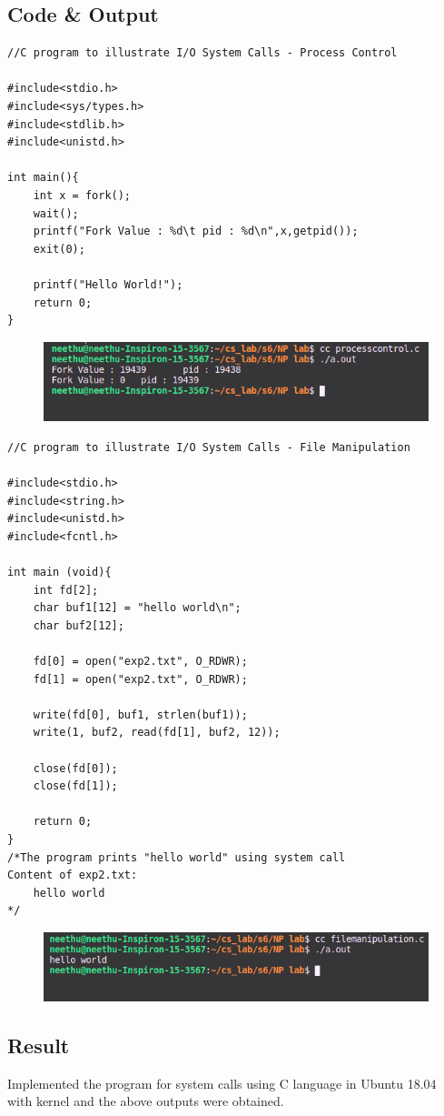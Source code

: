 \subsection{Code \& Output}
\begin{verbatim}
//C program to illustrate I/O System Calls - Process Control

#include<stdio.h>
#include<sys/types.h>
#include<stdlib.h>
#include<unistd.h>

int main(){
    int x = fork();
    wait();
    printf("Fork Value : %d\t pid : %d\n",x,getpid());
    exit(0);

    printf("Hello World!");
    return 0;
}   
\end{verbatim}
\begin{figure}[h]
            \centering
            \includegraphics[scale=0.6]{img/e21.png}
        \end{figure}
\begin{verbatim}
//C program to illustrate I/O System Calls - File Manipulation

#include<stdio.h>
#include<string.h>
#include<unistd.h>
#include<fcntl.h>

int main (void){
    int fd[2];
    char buf1[12] = "hello world\n";
    char buf2[12];
    
    fd[0] = open("exp2.txt", O_RDWR);		
    fd[1] = open("exp2.txt", O_RDWR);
    
    write(fd[0], buf1, strlen(buf1));		
    write(1, buf2, read(fd[1], buf2, 12));
    
    close(fd[0]);
    close(fd[1]);
    
    return 0;
}
/*The program prints "hello world" using system call
Content of exp2.txt:
    hello world
*/
\end{verbatim}
\begin{figure}[h]
            \centering
            \includegraphics[scale=0.6]{img/e22.png}
        \end{figure}
\subsection{Result}
Implemented the program for system calls using C language in Ubuntu 18.04 with kernel and the above outputs were obtained.
